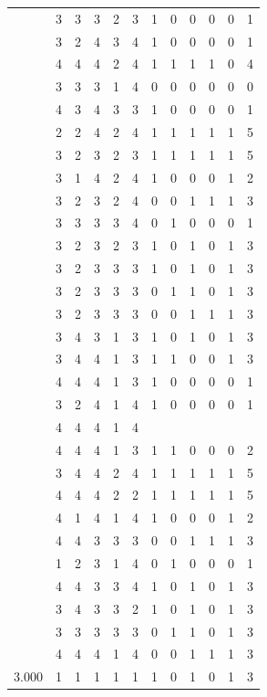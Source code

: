 \documentclass[]{msu-thesis}
\theoremstyle{definition}
\theoremstyle{definition}
\theoremstyle{definition}
\theoremstyle{remark}
\begin{document}
\begin{table}
{\begin{tabular}[t]{rrrrrrrrrrrr}
 & 3 & 3 & 3 & 2 & 3 & 1 & 0 & 0 & 0 & 0 & 1\\
 & 3 & 2 & 4 & 3 & 4 & 1 & 0 & 0 & 0 & 0 & 1\\
 & 4 & 4 & 4 & 2 & 4 & 1 & 1 & 1 & 1 & 0 & 4\\
 & 3 & 3 & 3 & 1 & 4 & 0 & 0 & 0 & 0 & 0 & 0\\
 & 4 & 3 & 4 & 3 & 3 & 1 & 0 & 0 & 0 & 0 & 1\\
 & 2 & 2 & 4 & 2 & 4 & 1 & 1 & 1 & 1 & 1 & 5\\
 & 3 & 2 & 3 & 2 & 3 & 1 & 1 & 1 & 1 & 1 & 5\\
 & 3 & 1 & 4 & 2 & 4 & 1 & 0 & 0 & 0 & 1 & 2\\
 & 3 & 2 & 3 & 2 & 4 & 0 & 0 & 1 & 1 & 1 & 3\\
 & 3 & 3 & 3 & 3 & 4 & 0 & 1 & 0 & 0 & 0 & 1\\
 & 3 & 2 & 3 & 2 & 3 & 1 & 0 & 1 & 0 & 1 & 3\\
 & 3 & 2 & 3 & 3 & 3 & 1 & 0 & 1 & 0 & 1 & 3\\
 & 3 & 2 & 3 & 3 & 3 & 0 & 1 & 1 & 0 & 1 & 3\\
 & 3 & 2 & 3 & 3 & 3 & 0 & 0 & 1 & 1 & 1 & 3\\
 & 3 & 4 & 3 & 1 & 3 & 1 & 0 & 1 & 0 & 1 & 3\\
 & 3 & 4 & 4 & 1 & 3 & 1 & 1 & 0 & 0 & 1 & 3\\
 & 4 & 4 & 4 & 1 & 3 & 1 & 0 & 0 & 0 & 0 & 1\\
 & 3 & 2 & 4 & 1 & 4 & 1 & 0 & 0 & 0 & 0 & 1\\
 & 4 & 4 & 4 & 1 & 4 &  &  &  &  &  & \\
 & 4 & 4 & 4 & 1 & 3 & 1 & 1 & 0 & 0 & 0 & 2\\
 & 3 & 4 & 4 & 2 & 4 & 1 & 1 & 1 & 1 & 1 & 5\\
 & 4 & 4 & 4 & 2 & 2 & 1 & 1 & 1 & 1 & 1 & 5\\
 & 4 & 1 & 4 & 1 & 4 & 1 & 0 & 0 & 0 & 1 & 2\\
 & 4 & 4 & 3 & 3 & 3 & 0 & 0 & 1 & 1 & 1 & 3\\
 & 1 & 2 & 3 & 1 & 4 & 0 & 1 & 0 & 0 & 0 & 1\\
 & 4 & 4 & 3 & 3 & 4 & 1 & 0 & 1 & 0 & 1 & 3\\
 & 3 & 4 & 3 & 3 & 2 & 1 & 0 & 1 & 0 & 1 & 3\\
 & 3 & 3 & 3 & 3 & 3 & 0 & 1 & 1 & 0 & 1 & 3\\
 & 4 & 4 & 4 & 1 & 4 & 0 & 0 & 1 & 1 & 1 & 3\\
3.000 & 1 & 1 & 1 & 1 & 1 & 1 & 0 & 1 & 0 & 1 & 3\\

\end{tabular}}
\end{table}
\end{document}
